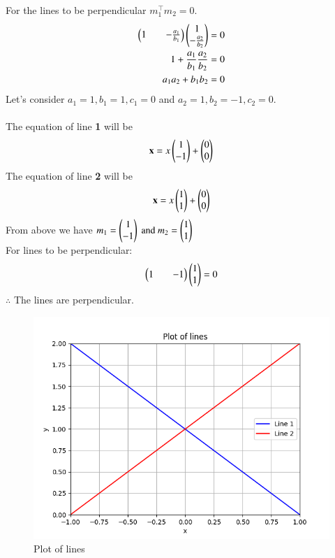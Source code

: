 \documentclass[journal]{IEEEtran}
\begin{document}
For the lines to be perpendicular $m_1^\top m_2 = 0.$\label{eq1.5.37.1}
\begin{align}
    \begin{pmatrix}1 && -\frac{a_1}{b_1}\end{pmatrix}\begin{pmatrix}1 \\ -\frac{a_2}{b_2}\end{pmatrix} = 0\\
    1 + \frac{a_1}{b_1}\frac{a_2}{b_2} = 0\\
    a_1a_2 + b_1b_2 = 0
\end{align}
Let's consider $a_1 = 1, b_1 = 1, c_1 = 0$ and 
$a_2 = 1, b_2 = -1, c_2 =0. $\\ \\
The equation of line \textbf{1} will be
\begin{align}
\mathbf{x} = x\begin{pmatrix}1 \\ -1\end{pmatrix} + \begin{pmatrix}0 \\ 0\end{pmatrix}
\end{align}
The equation of line \textbf{2} will be
\begin{align}
\mathbf{x} = x\begin{pmatrix}1 \\ 1\end{pmatrix} + \begin{pmatrix}0 \\ 0\end{pmatrix}
\end{align}
From above we have $m_1 = \begin{pmatrix}1 \\-1 \end{pmatrix} \text{ and } m_2 = \begin{pmatrix}1 \\ 1\end{pmatrix} $ \\
For lines to be perpendicular:
\begin{align}
    \begin{pmatrix}1 && -1\end{pmatrix}\begin{pmatrix}1\\ 1\end{pmatrix} = 0    
\end{align}
 $\therefore$ The lines are perpendicular.

 \begin{figure}[h!]
   \centering
   \includegraphics[width=0.7\linewidth]{figs/fig.png}
   \caption{Plot of lines}
   \label{stemplot}
\end{figure}
\end{document}

